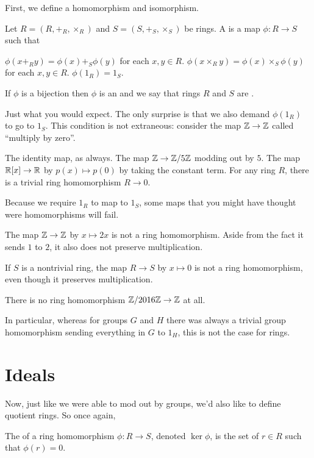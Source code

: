 First, we define a homomorphism and isomorphism.
\begin{definition}
	Let $R = (R, +_R, \times_R)$ and $S = (S, +_S, \times_S)$ be rings.
	A  is a map $\phi \colon R \to S$
	such that
	\begin{enumerate}[(i)]
		\ii $\phi(x +_R y) = \phi(x) +_S \phi(y)$ for each $x,y \in R$.
		\ii $\phi(x \times_R y) = \phi(x) \times_S \phi(y)$ for each $x,y \in R$.
		\ii $\phi(1_R) = 1_S$.
	\end{enumerate}
	If $\phi$ is a bijection then $\phi$ is an 
	and we say that rings $R$ and $S$ are .
\end{definition}
Just what you would expect.
The only surprise is that we also demand $\phi(1_R)$ to go to $1_S$.
This condition is not extraneous:
consider the map $\mathbb Z \to \mathbb Z$ called ``multiply by zero''.
\begin{example}
	\listhack
	\begin{enumerate}[(a)]
		\ii The identity map, as always.
		\ii The map $\mathbb Z \to \mathbb Z/5\mathbb Z$ modding out by $5$.
		\ii The map $\mathbb R[x] \to \mathbb R$ by $p(x) \mapsto p(0)$
		by taking the constant term.
		\ii For any ring $R$, there is a trivial ring homomorphism $R \to 0$.
	\end{enumerate}
\end{example}
\begin{example}
	Because we require $1_R$ to map to $1_S$, some maps that you
	might have thought were homomorphisms will fail.
	\begin{enumerate}[(a)]
		\ii The map $\mathbb Z \to \mathbb Z$ by $x \mapsto 2x$
		is not a ring homomorphism.
		Aside from the fact it sends $1$ to $2$,
		it also does not preserve multiplication.

		\ii If $S$ is a nontrivial ring,
		the map $R \to S$ by $x \mapsto 0$ is not
		a ring homomorphism, even though it preserves multiplication.

		\ii There is no ring homomorphism $\mathbb Z/2016\mathbb Z \to \mathbb Z$ at all.
	\end{enumerate}
	In particular, whereas for groups $G$ and $H$
	there was always a trivial group homomorphism sending
	everything in $G$ to $1_H$, this is not the case for rings.
\end{example}

\section{Ideals}
Now, just like we were able to mod out by groups,
we'd also like to define quotient rings.
So once again,
\begin{definition}
	The  of a ring homomorphism $\phi \colon R \to S$,
	denoted $\ker \phi$, is the set of $r \in R$ such that $\phi(r) = 0$.
\end{definition}

